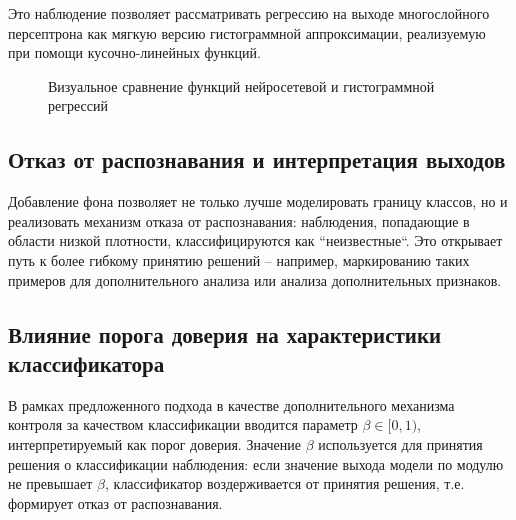 Это наблюдение позволяет рассматривать регрессию на выходе многослойного персептрона как мягкую версию гистограммной аппроксимации, реализуемую при помощи кусочно-линейных функций.

\begin{figure}[ht]
    \caption{Визуальное сравнение функций нейросетевой и гистограммной регрессий}
    \label{fig:cn_vs_hn}
\end{figure}

\subsection{Отказ от распознавания и интерпретация выходов}

Добавление фона позволяет не только лучше моделировать границу классов, но и реализовать механизм отказа от распознавания: наблюдения, попадающие в области низкой плотности, классифицируются как ``неизвестные``. Это открывает путь к более гибкому принятию решений -- например, маркированию таких примеров для дополнительного анализа или анализа дополнительных признаков.

\subsection{Влияние порога доверия на характеристики классификатора}
В рамках предложенного подхода в качестве дополнительного механизма контроля за качеством классификации вводится параметр \(\beta \in [0, 1)\), интерпретируемый как порог доверия. Значение \(\beta\) используется для принятия решения о классификации наблюдения: если значение выхода модели по модулю не превышает \(\beta\), классификатор воздерживается от принятия решения, т.е. формирует отказ от распознавания.

